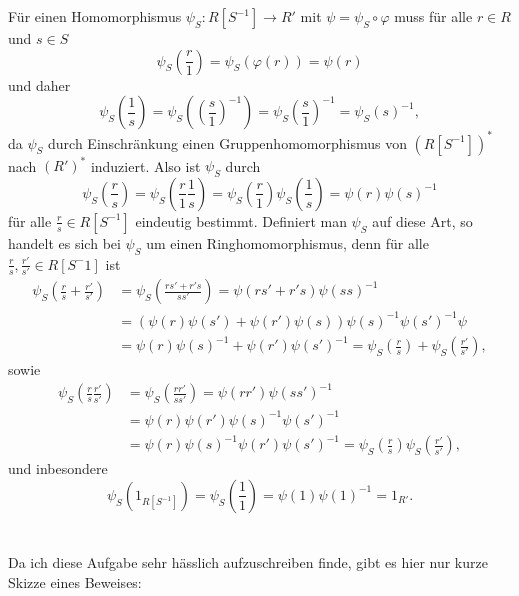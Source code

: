 \documentclass[a4paper,10pt]{article}
\theoremstyle{definition}
\begin{document}
Für einen Homomorphismus $\psi_S : R[S^{-1}] \rightarrow R'$ mit $\psi = \psi_S \circ \varphi$ muss für alle $r \in R$ und $s \in S$
\[
 \psi_S\left(\frac{r}{1}\right)
 = \psi_S( \varphi(r) )
 = \psi(r)
\]
und daher
\[
 \psi_S\left(\frac{1}{s}\right)
 = \psi_S\left( \left (\frac{s}{1} \right)^{-1} \right)
 = \psi_S\left( \frac{s}{1} \right)^{-1}
 = \psi_S(s)^{-1},
\]
da $\psi_S$ durch Einschränkung einen Gruppenhomomorphismus von $(R[S^{-1}])^*$ nach $(R')^*$ induziert. Also ist $\psi_S$ durch
\[
 \psi_S\left(\frac{r}{s}\right)
 = \psi_S\left(\frac{r}{1} \frac{1}{s}\right)
 = \psi_S\left(\frac{r}{1}\right) \psi_S\left(\frac{1}{s}\right)
 = \psi(r)\psi(s)^{-1}
\]
für alle $\frac{r}{s} \in R[S^{-1}]$ eindeutig bestimmt. Definiert man $\psi_S$ auf diese Art, so handelt es sich bei $\psi_S$ um einen Ringhomomorphismus, denn für alle $\frac{r}{s}, \frac{r'}{s'} \in R[S^-1]$ ist
\begin{align*}
 \psi_S\left( \frac{r}{s} + \frac{r'}{s'} \right)
 &= \psi_S\left( \frac{rs' + r's}{ss'} \right)
 = \psi(rs' + r's)\psi(ss)^{-1} \\
 &= \left( \psi(r)\psi(s') + \psi(r')\psi(s) \right) \psi(s)^{-1}\psi(s')^{-1} \psi \\
 &= \psi(r)\psi(s)^{-1} + \psi(r')\psi(s')^{-1}
 = \psi_S\left(\frac{r}{s}\right) + \psi_S\left(\frac{r'}{s'}\right),
\end{align*}
sowie
\begin{align*}
 \psi_S\left(\frac{r}{s} \frac{r'}{s'}\right)
 &= \psi_S\left(\frac{rr'}{ss'}\right)
 = \psi(rr')\psi(ss')^{-1} \\
 &= \psi(r)\psi(r')\psi(s)^{-1}\psi(s')^{-1} \\
 &= \psi(r)\psi(s)^{-1} \psi(r')\psi(s')^{-1}
 = \psi_S\left(\frac{r}{s}\right) \psi_S\left(\frac{r'}{s'}\right),
\end{align*}
und inbesondere
\[
 \psi_S\left(1_{R[S^{-1}]}\right)
 = \psi_S\left(\frac{1}{1}\right)
 = \psi(1) \psi(1)^{-1}
 = 1_{R'}.
\]





\section{}
Da ich diese Aufgabe sehr hässlich aufzuschreiben finde, gibt es hier nur kurze Skizze eines Beweises:
\end{document}
